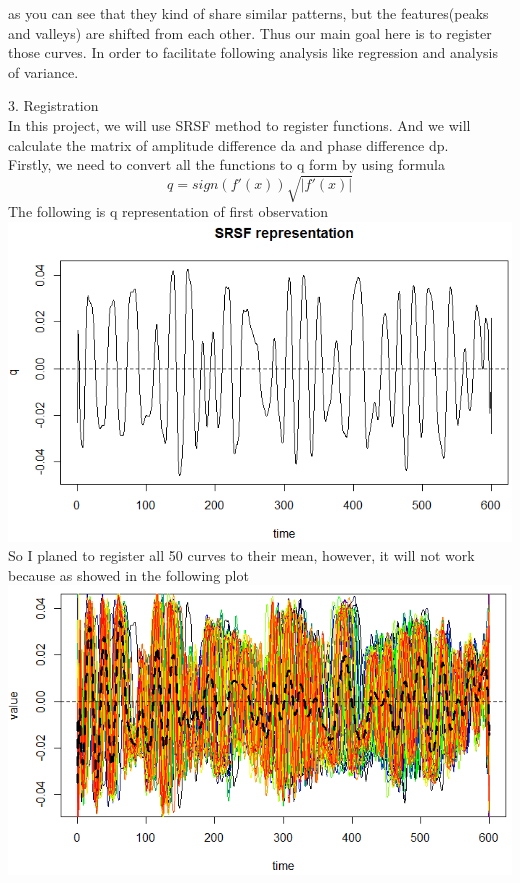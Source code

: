 \documentclass[11pt]{scrartcl}
\begin{document}
as you can see that they kind of share similar patterns, but the features(peaks and valleys) are shifted from each other. Thus our main goal here is to register those curves. In order to facilitate following analysis like regression and analysis of variance.\\

\bigskip

3. Registration\\
In this project, we will use SRSF method to register functions. And we will calculate the matrix of amplitude difference da and phase difference dp.\\
Firstly, we need to convert all the functions to q form by using formula
$$
q=sign(f'(x))\sqrt{|f'(x)|}$$
The following is q representation of first observation\\
\includegraphics[scale=0.7]{fp05.png}\\
So I planed to register all 50 curves to their mean, however, it will not work because as showed in the following plot\\
\includegraphics[scale=0.7]{fp06.png}\\
\end{document}
